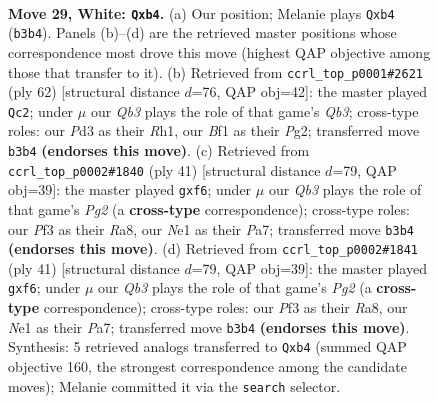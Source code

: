 \documentclass[11pt]{article}
\begin{document}
\clearpage

\begin{figure}[p]\centering
\begin{subfigure}{0.46\textwidth}\centering
\resizebox{\linewidth}{!}{%
\newchessgame
\chessboard[
  setfen={n1b4r/1p4k1/8/6pp/1n6/PQ1P1P2/5q2/4NB1K w - - 1 29},
  showmover=false,
  pgfstyle=straightmove, color=movearrow, markmove={b3-b4}
]}
\caption{}
\end{subfigure}\hfill
\begin{subfigure}{0.46\textwidth}\centering
\resizebox{\linewidth}{!}{%
\newchessgame
\chessboard[
  setfen={3r2k1/5p2/1n2p3/4P3/8/1Q3N2/1P2q1P1/1K5R w - - 2 32},
  showmover=false,
  pgfstyle=straightmove, color=movearrow, markmove={b3-c2}
]}
\caption{}
\end{subfigure}
\\[4pt]
\begin{subfigure}{0.46\textwidth}\centering
\resizebox{\linewidth}{!}{%
\newchessgame
\chessboard[
  setfen={r7/pp3kpp/5N2/8/3q4/8/PP4PP/4QR1K b - - 2 21},
  showmover=false,
  pgfstyle=straightmove, color=movearrow, markmove={g7-f6}
]}
\caption{}
\end{subfigure}\hfill
\begin{subfigure}{0.46\textwidth}\centering
\resizebox{\linewidth}{!}{%
\newchessgame
\chessboard[
  setfen={r7/pp3kpp/5N2/8/3q4/8/PP4PP/4QR1K b - - 2 21},
  showmover=false,
  pgfstyle=straightmove, color=movearrow, markmove={g7-f6}
]}
\caption{}
\end{subfigure}
\caption{\textbf{Move 29, White: \texttt{Qxb4}.} (a) Our position; Melanie plays \texttt{Qxb4} (\texttt{b3b4}). Panels (b)--(d) are the retrieved master positions whose correspondence most drove this move (highest QAP objective among those that transfer to it). (b) Retrieved from \texttt{ccrl\_top\_p0001\#2621} (ply 62) [structural distance $d$=76, QAP obj=42]: the master played \texttt{Qc2}; under $\mu$ our \emph{Qb3} plays the role of that game's \emph{Qb3}; cross-type roles: our \emph{P}d3 as their \emph{R}h1, our \emph{B}f1 as their \emph{P}g2; transferred move \texttt{b3b4} \textbf{(endorses this move)}. (c) Retrieved from \texttt{ccrl\_top\_p0002\#1840} (ply 41) [structural distance $d$=79, QAP obj=39]: the master played \texttt{gxf6}; under $\mu$ our \emph{Qb3} plays the role of that game's \emph{Pg2} (a \textbf{cross-type} correspondence); cross-type roles: our \emph{P}f3 as their \emph{R}a8, our \emph{N}e1 as their \emph{P}a7; transferred move \texttt{b3b4} \textbf{(endorses this move)}. (d) Retrieved from \texttt{ccrl\_top\_p0002\#1841} (ply 41) [structural distance $d$=79, QAP obj=39]: the master played \texttt{gxf6}; under $\mu$ our \emph{Qb3} plays the role of that game's \emph{Pg2} (a \textbf{cross-type} correspondence); cross-type roles: our \emph{P}f3 as their \emph{R}a8, our \emph{N}e1 as their \emph{P}a7; transferred move \texttt{b3b4} \textbf{(endorses this move)}. Synthesis: 5 retrieved analogs transferred to \texttt{Qxb4} (summed QAP objective 160, the strongest correspondence among the candidate moves); Melanie committed it via the \texttt{search} selector.}
\label{fig:thought-m56}
\end{figure}
\end{document}
